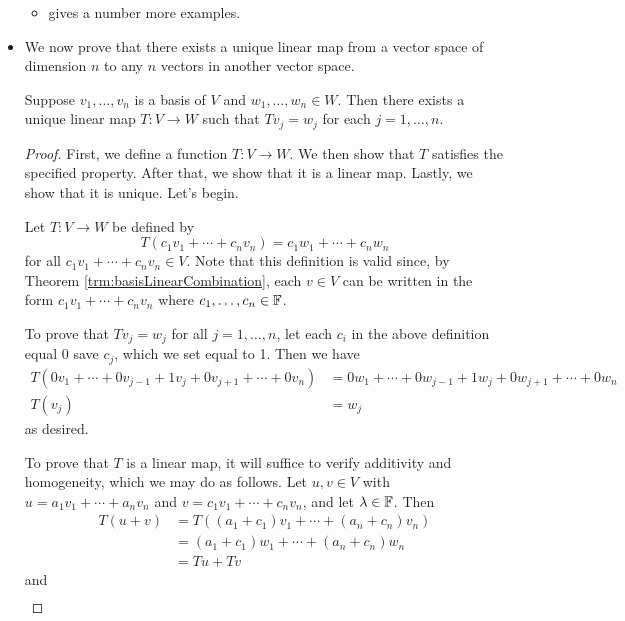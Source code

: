 \documentclass[../main.tex]{subfiles}
\begin{document}
\begin{itemize}
\begin{itemize}
        \item \textcite{bib:Axler} gives a number more examples.
    \end{itemize}
    \item We now prove that there exists a unique linear map from a vector space of dimension $n$ to any $n$ vectors in another vector space.
    \begin{theorem}\label{trm:mapBasisToBasis}
        Suppose $v_1,\dots,v_n$ is a basis of $V$ and $w_1,\dots,w_n\in W$. Then there exists a unique linear map $T:V\to W$ such that $Tv_j=w_j$ for each $j=1,\dots,n$.
        \begin{proof}
            First, we define a function $T:V\to W$. We then show that $T$ satisfies the specified property. After that, we show that it is a linear map. Lastly, we show that it is unique. Let's begin.\par
            Let $T:V\to W$ be defined by
            \begin{equation*}
                T(c_1v_1+\cdots+c_nv_n) = c_1w_1+\cdots+c_nw_n
            \end{equation*}
            for all $c_1v_1+\cdots+c_nv_n\in V$. Note that this definition is valid since, by Theorem \ref{trm:basisLinearCombination}, each $v\in V$ can be written in the form $c_1v_1+\cdots+c_nv_n$ where $c_1,\dots,c_n\in\mathbb{F}$.\par
            To prove that $Tv_j=w_j$ for all $j=1,\dots,n$, let each $c_i$ in the above definition equal 0 save $c_j$, which we set equal to 1. Then we have
            \begin{align*}
                T(0v_1+\cdots+0v_{j-1}+1v_j+0v_{j+1}+\cdots+0v_n) &= 0w_1+\cdots+0w_{j-1}+1w_j+0w_{j+1}+\cdots+0w_n\\
                T(v_j) &= w_j
            \end{align*}
            as desired.\par
            To prove that $T$ is a linear map, it will suffice to verify additivity and homogeneity, which we may do as follows. Let $u,v\in V$ with $u=a_1v_1+\cdots+a_nv_n$ and $v=c_1v_1+\cdots+c_nv_n$, and let $\lambda\in\mathbb{F}$. Then
            \begin{align*}
                T(u+v) &= T((a_1+c_1)v_1+\cdots+(a_n+c_n)v_n)\\
                &= (a_1+c_1)w_1+\cdots+(a_n+c_n)w_n\\
                &= Tu+Tv
            \end{align*}
            and
            \begin{align*}

\end{align*}
\end{proof}
\end{theorem}
\end{itemize}
\end{document}
